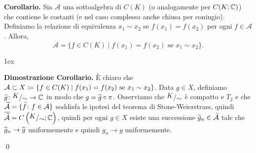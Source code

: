 \textbf{Corollario.}
Sia $\mathcal A$ una sottoalgebra di $C(K)$ (o analogamente per $C(K; \mathbb C)$) che contiene le costanti (e nel caso complesso anche chiusa per coniugio). Definiamo la relazione di equivalenza $x_1 \sim x_2$ se $f(x_1) = f(x_2)$ per ogni $f \in \mathcal A$. Allora,
$$
	\overline{\mathcal A} = \{ f \in C(K) \mid f(x_1) = f(x_2) \text{ se } x_1 \sim x_2 \}.
$$
\begin{minipage}{\textwidth - 2.5em}
\parskip 1ex
\setlength{\parindent}{0pt}

\begin{wrapfigure}{r}{100pt}
	\centering
	\vspace{-1.5\baselineskip}
	\vspace{-1.5\baselineskip}
\end{wrapfigure}

\textbf{Dimostrazione Corollario.}
È chiaro che $\mathcal{A} \subset X \coloneqq \{ f \in C(K) \mid f(x_1) = f(x_2) \text{ se } x_1 \sim x_2 \}$. Data $g \in X$, definiamo $\wtilde{g} \colon \sfrac{K}{\sim} \to \C$ in modo che $g = \widetilde{g} \circ \pi$.
Osserviamo che $\sfrac{K}{\sim}$ è compatto e $T_2$ e che $\widetilde{\mathcal{A}} = \{\widetilde{f} \colon  f \in \mathcal{A}\}$ soddisfa le ipotesi del teorema di Stone-Weierstrass, quindi $\ol{\wtilde{\mc{A}}} = C\left( \sfrac{K}{\sim} ;\C \right)$, quindi per ogni $g \in X$ esiste una successione $\widetilde{g}_n \in \widetilde{\mathcal{A}}$ tale che $\widetilde{g}_n \to \widetilde{g}$ uniformemente e quindi $g_n \to g$ uniformemente.

\qed
\end{minipage}

\vss

